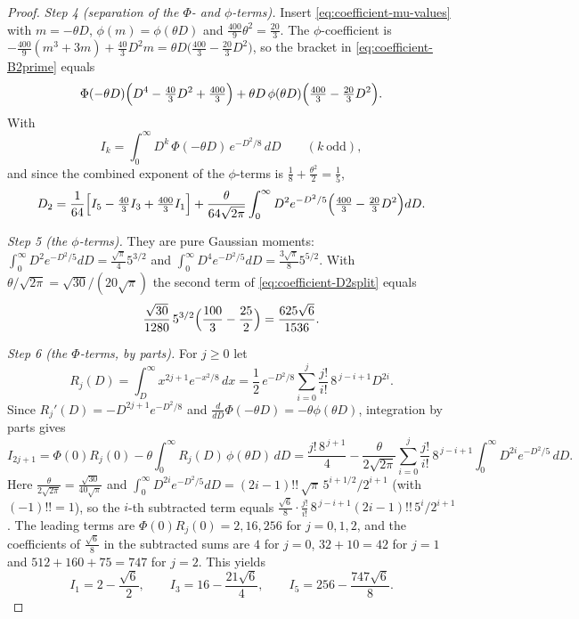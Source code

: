 \begin{proof}
\emph{Step 4 (separation of the $\Phi$- and $\phi$-terms).} Insert \eqref{eq:coefficient-mu-values} with $m=-\theta D$, $\phi(m)=\phi(\theta D)$ and $\frac{400}{9}\theta^2=\frac{20}{3}$. The $\phi$-coefficient is $-\frac{400}{9}(m^3+3m)+\frac{40}{3}D^2m=\theta D\bigl(\frac{400}{3}-\frac{20}{3}D^2\bigr)$, so the bracket in \eqref{eq:coefficient-B2prime} equals
\[
\Phi(-\theta D)\Bigl(D^4-\tfrac{40}{3}D^2+\tfrac{400}{3}\Bigr)+\theta D\,\phi(\theta D)\Bigl(\tfrac{400}{3}-\tfrac{20}{3}D^2\Bigr).
\]
With
\begin{equation}\label{eq:coefficient-Ik}
I_k=\int_0^\infty D^k\,\Phi(-\theta D)\,e^{-D^2/8}\,dD\qquad(k\ \text{odd}),
\end{equation}
and since the combined exponent of the $\phi$-terms is $\frac18+\frac{\theta^2}2=\frac15$,
\begin{equation}\label{eq:coefficient-D2split}
D_2=\frac1{64}\Bigl[I_5-\tfrac{40}{3}I_3+\tfrac{400}{3}I_1\Bigr]+\frac{\theta}{64\sqrt{2\pi}}\int_0^\infty D^2e^{-D^2/5}\Bigl(\tfrac{400}{3}-\tfrac{20}{3}D^2\Bigr)dD .
\end{equation}

\emph{Step 5 (the $\phi$-terms).} They are pure Gaussian moments: $\int_0^\infty D^2e^{-D^2/5}dD=\frac{\sqrt\pi}{4}5^{3/2}$ and $\int_0^\infty D^4e^{-D^2/5}dD=\frac{3\sqrt\pi}{8}5^{5/2}$. With $\theta/\sqrt{2\pi}=\sqrt{30}/(20\sqrt\pi)$ the second term of \eqref{eq:coefficient-D2split} equals
\[
\frac{\sqrt{30}}{1280}\,5^{3/2}\Bigl(\frac{100}{3}-\frac{25}{2}\Bigr)=\frac{625\sqrt6}{1536}.
\]

\emph{Step 6 (the $\Phi$-terms, by parts).} For $j\ge0$ let
\[
R_j(D)=\int_D^\infty x^{2j+1}e^{-x^2/8}\,dx=\frac12\,e^{-D^2/8}\sum_{i=0}^j\frac{j!}{i!}\,8^{\,j-i+1}D^{2i}.
\]
Since $R_j'(D)=-D^{2j+1}e^{-D^2/8}$ and $\frac{d}{dD}\Phi(-\theta D)=-\theta\phi(\theta D)$, integration by parts gives
\[
I_{2j+1}=\Phi(0)R_j(0)-\theta\int_0^\infty R_j(D)\,\phi(\theta D)\,dD
=\frac{j!\,8^{\,j+1}}{4}-\frac{\theta}{2\sqrt{2\pi}}\sum_{i=0}^j\frac{j!}{i!}\,8^{\,j-i+1}\int_0^\infty D^{2i}e^{-D^2/5}\,dD .
\]
Here $\frac{\theta}{2\sqrt{2\pi}}=\frac{\sqrt{30}}{40\sqrt\pi}$ and $\int_0^\infty D^{2i}e^{-D^2/5}dD=(2i-1)!!\,\sqrt\pi\,5^{i+1/2}/2^{i+1}$ (with $(-1)!!=1$), so the $i$-th subtracted term equals $\frac{\sqrt6}{8}\cdot\frac{j!}{i!}\,8^{\,j-i+1}(2i-1)!!\,5^i/2^{i+1}$. The leading terms are $\Phi(0)R_j(0)=2,16,256$ for $j=0,1,2$, and the coefficients of $\frac{\sqrt6}{8}$ in the subtracted sums are $4$ for $j=0$, $32+10=42$ for $j=1$ and $512+160+75=747$ for $j=2$. This yields
\begin{equation}\label{eq:coefficient-I135}
I_1=2-\frac{\sqrt6}{2},\qquad I_3=16-\frac{21\sqrt6}{4},\qquad I_5=256-\frac{747\sqrt6}{8}.
\end{equation}


\end{proof}
